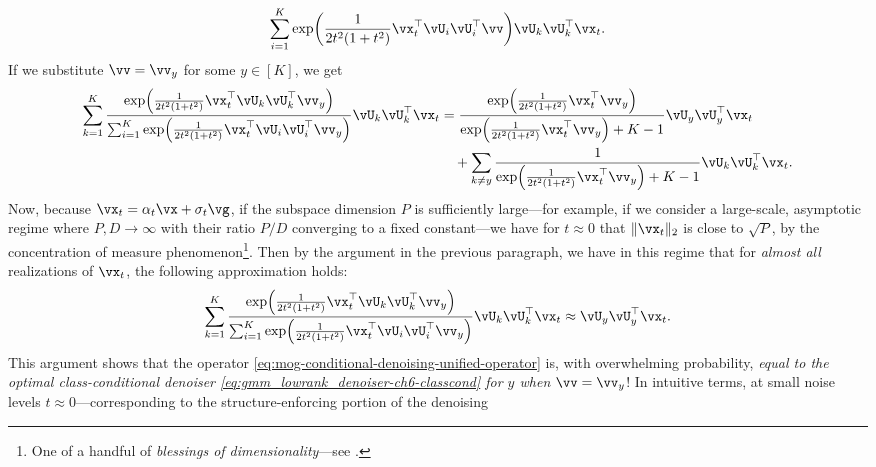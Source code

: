 \documentclass[../../book-main.tex]{subfiles}
\begin{document}
\begin{example}
\begin{equation}
{    }
    {
      \sum_{i
      = 1}^{K}\exp\rp{\frac{1}{2t^{2}(1
      + t^{2})}\vx_t^\top \vU_i \vU_i^\top \vv}
    }
    \vU_{k}\vU_{k}^{\top}\vx_t.
  \end{equation}
  If we substitute $\vv = \vv_y$ for some $y \in [K]$, we get
  \begin{align}
    \begin{split}
    \sum_{k = 1}^{K}
    \frac{
      \exp\rp{\frac{1}{2t^{2}(1
      + t^{2})}\vx_t^\top \vU_k \vU_k^\top \vv_y}
    }
    {
      \sum_{i
      = 1}^{K}\exp\rp{\frac{1}{2t^{2}(1
      + t^{2})}\vx_t^\top \vU_i \vU_i^\top \vv_y}
    }
    \vU_{k}\vU_{k}^{\top}\vx_t
    &=
    \frac{
      \exp\rp{\frac{1}{2t^{2}(1
      + t^{2})}\vx_t^\top \vv_y}
    }
    {
      \exp\rp{\frac{1}{2t^{2}(1
      + t^{2})}\vx_t^\top \vv_y}
      + K-1
    }
    \vU_{y}\vU_{y}^{\top}\vx_t
    \\
    &\quad+
    \sum_{k \neq y}
    \frac{
      1
    }
    {
      \exp\rp{\frac{1}{2t^{2}(1
      + t^{2})}\vx_t^\top \vv_y}
      + K-1
    }
    \vU_{k}\vU_{k}^{\top}\vx_t.
    \end{split}
  \end{align}
  Now, because $\vx_t = \alpha_t \vx + \sigma_t \vg$, if the subspace dimension
  $P$ is sufficiently large---for example, if we consider a large-scale,
  asymptotic regime where $P, D \to \infty$ with their ratio $P/D$ converging to
  a fixed constant---we have for $t \approx 0$ that $\norm{\vx_t}_2$ is close to
  $\sqrt{P}$, by the concentration of measure phenomenon\footnote{One of
  a handful of \textit{blessings of dimensionality}---see
  \textcite{Wright-Ma-2022}.}. Then
  by the argument in the previous paragraph, we have in this regime that for
  \textit{almost all} realizations of $\vx_t$, the following approximation
  holds:
  \begin{equation}
    \sum_{k = 1}^{K}
    \frac{
      \exp\rp{\frac{1}{2t^{2}(1
      + t^{2})}\vx_t^\top \vU_k \vU_k^\top \vv_y}
    }
    {
      \sum_{i
      = 1}^{K}\exp\rp{\frac{1}{2t^{2}(1
      + t^{2})}\vx_t^\top \vU_i \vU_i^\top \vv_y}
    }
    \vU_{k}\vU_{k}^{\top}\vx_t
    \approx
    \vU_{y}\vU_{y}^{\top}\vx_t.
  \end{equation}
  This argument shows that the operator
  \eqref{eq:mog-conditional-denoising-unified-operator} is, with overwhelming
  probability, \textit{equal to the optimal class-conditional denoiser
  \eqref{eq:gmm_lowrank_denoiser-ch6-classcond} for $y$
  when $\vv = \vv_y$}! In intuitive terms, at small noise levels $t \approx
  0$---corresponding to the structure-enforcing portion of the denoising

\end{example}
\end{document}
